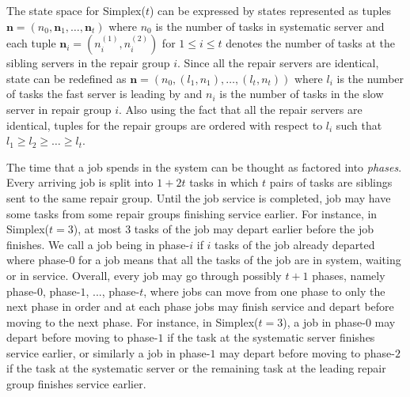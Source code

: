 \documentclass[sigconf,draft]{acmart}
\begin{document}
The state space for Simplex($t$) can be expressed by states represented as tuples $\bm{n} = (n_0, \bm{n}_1, \ldots, \bm{n}_t)$ where $n_0$ is the number of tasks in systematic server and each tuple $\bm{n}_i = (n_i^{(1)}, n_i^{(2)})$ for $1 \leq i \leq t$ denotes the number of tasks at the sibling servers in the repair group $i$. Since all the repair servers are identical, state can be redefined as $\bm{n} = (n_0, (l_1, n_1), \ldots, (l_t, n_t))$ where $l_i$ is the number of tasks the fast server is leading by and $n_i$ is the number of tasks in the slow server in repair group $i$. Also using the fact that all the repair servers are identical, tuples for the repair groups are ordered with respect to $l_i$ such that $l_1 \geq l_2 \geq \ldots \geq l_t$.

The time that a job spends in the system can be thought as factored into \emph{phases}. Every arriving job is split into $1+2t$ tasks in which $t$ pairs of tasks are siblings sent to the same repair group. Until the job service is completed, job may have some tasks from some repair groups finishing service earlier. For instance, in Simplex($t=3$), at most $3$ tasks of the job may depart earlier before the job finishes. We call a job being in phase-$i$ if $i$ tasks of the job already departed where phase-$0$ for a job means that all the tasks of the job are in system, waiting or in service. Overall, every job may go through possibly $t+1$ phases, namely phase-$0$, phase-$1$, ..., phase-$t$, where jobs can move from one phase to only the next phase in order and at each phase jobs may finish service and depart before moving to the next phase. For instance, in Simplex($t=3$), a job in phase-$0$ may depart before moving to phase-$1$ if the task at the systematic server finishes service earlier, or similarly a job in phase-$1$ may depart before moving to phase-$2$ if the task at the systematic server or the remaining task at the leading repair group finishes service earlier.
\end{document}
